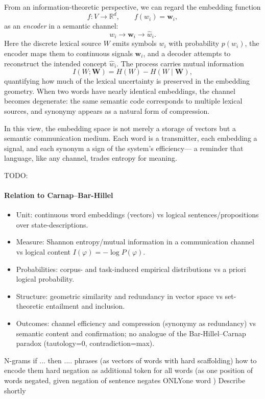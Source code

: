 \documentclass[12pt,a4paper]{article}
\begin{document}
\vspace{1em}

From an information-theoretic perspective, we can regard the embedding function
\begin{equation}
f : V \rightarrow \mathbb{R}^d, \qquad f(w_i)=\bm{w}_i,
\end{equation}
as an {\it encoder} in a semantic channel:
\[
w_i \longrightarrow \bm{w}_i \longrightarrow \hat{w}_i .
\]
Here the discrete lexical source $W$ emits symbols $w_i$ with probability $p(w_i)$, 
the encoder maps them to continuous signals $\bm{w}_i$, 
and a decoder attempts to reconstruct the intended concept $\hat{w}_i$.  
The process carries mutual information
\begin{equation}
I(W;\bm{W}) = H(W) - H(W\mid \bm{W}),
\end{equation}
quantifying how much of the lexical uncertainty is preserved in the embedding geometry.  
When two words have nearly identical embeddings, 
the channel becomes degenerate: the same semantic code corresponds to multiple lexical sources, 
and synonymy appears as a natural form of compression.

\vspace{1em}

In this view, the embedding space is not merely a storage of vectors but a 
semantic communication medium.  
Each word is a transmitter, each embedding a signal, and each synonym a sign of the system's efficiency---  
a reminder that language, like any channel, trades entropy for meaning.

TODO:
\paragraph*{Relation to Carnap–Bar-Hillel}
\begin{itemize}
\item Unit: continuous word embeddings (vectors) vs logical sentences/propositions over state-descriptions.
\item Measure: Shannon entropy/mutual information in a communication channel vs logical content \(I(\varphi) = -\log P(\varphi)\).
\item Probabilities: corpus- and task-induced empirical distributions vs a priori logical probability.
\item Structure: geometric similarity and redundancy in vector space vs set-theoretic entailment and inclusion.
\item Outcomes: channel efficiency and compression (synonymy as redundancy) vs semantic content and confirmation; no analogue of the Bar-Hillel–Carnap paradox (tautology=0, contradiction=max).
\end{itemize}


N-grams 
if ... then .... phrases (as vectors of words  with hard scaffolding) 
how to encode them hard 
negation as additional token for all words (as one position of words negated, given negation of sentence negates ONLYone word )
Describe shortly 
\end{document}
